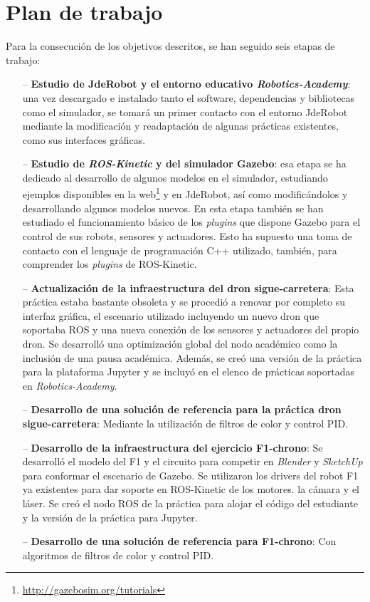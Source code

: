 \section{Plan de trabajo}
Para la consecución de los objetivos descritos, se han seguido seis etapas de trabajo:

\begin{itemize}
	\item[--] \textbf{Estudio de JdeRobot y el entorno educativo \textit{Robotics-Academy}}: una vez descargado e instalado tanto el software, dependencias y bibliotecas como el simulador, se tomará un primer contacto con el entorno JdeRobot mediante la modificación y readaptación de algunas prácticas existentes, como sus interfaces gráficas.
	\item[--] \textbf{Estudio de \textit{ROS-Kinetic} y del simulador Gazebo}: esa etapa se ha dedicado al desarrollo de algunos modelos en el simulador, estudiando ejemplos disponibles en la web\footnote{\url{http://gazebosim.org/tutorials}} y en JdeRobot, así como modificándolos y desarrollando algunos modelos nuevos. En esta etapa también se han estudiado el funcionamiento básico de los \textit{plugins} que dispone Gazebo para el control de sus robots, sensores y actuadores. Esto ha supuesto una toma de contacto con el lenguaje de programación C++ utilizado, también, para comprender los \textit{plugins} de ROS-Kinetic.
	\item[--] \textbf{Actualización de la infraestructura del dron sigue-carretera}: Esta práctica estaba bastante obsoleta y se procedió a renovar por completo su interfaz gráfica, el escenario utilizado incluyendo un nuevo dron que soportaba ROS y una nueva conexión de los sensores y actuadores del propio dron. Se desarrolló una optimización global del nodo académico como la inclusión de una pausa académica. Además, se creó una versión de la práctica para la plataforma Jupyter y se incluyó en el elenco de prácticas soportadas en \textit{Robotics-Academy}.
	\item[--] \textbf{Desarrollo de una solución de referencia para la práctica dron sigue-carretera}: Mediante la utilización de filtros de color y control PID.
	\item[--] \textbf{Desarrollo de la infraestructura del ejercicio F1-chrono}: Se desarrolló el modelo del F1 y el circuito para competir en \textit{Blender} y \textit{SketchUp} para conformar el escenario de Gazebo. Se utilizaron los drivers del robot F1 ya existentes para dar soporte en ROS-Kinetic de los motores. la cámara y el láser. Se creó el nodo ROS de la práctica para alojar el código del estudiante y la versión de la práctica para Jupyter.
	\item[--] \textbf{Desarrollo de una solución de referencia para F1-chrono}: Con algoritmos de filtros de color y control PID.
\end{itemize}